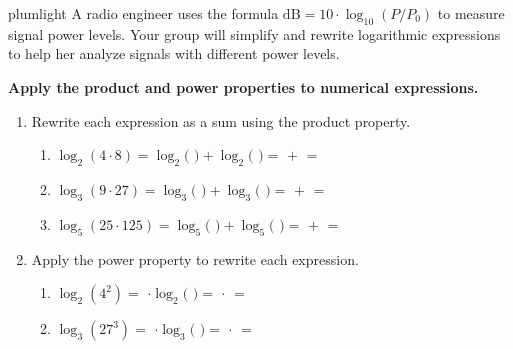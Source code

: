 \documentclass[10pt]{article}
\begin{document}
\namepartnerperiod

\vspace{0.1in}

\begin{scenariobox}{plumlight}
A radio engineer uses the formula $\text{dB} = 10 \cdot \log_{10}(P/P_0)$ to measure signal
power levels. Your group will simplify and rewrite logarithmic expressions to help her
analyze signals with different power levels.
\end{scenariobox}

\vspace{0.1in}

\begin{tcolorbox}[colback=white, colframe=black!40,
    title=\textbf{Tier R --- Remediate},
    fonttitle=\bfseries, arc=2mm, left=3mm, right=3mm, top=2mm, bottom=2mm]

\textbf{Apply the product and power properties to numerical expressions.}

\begin{enumerate}[leftmargin=1.8em, itemsep=10pt]

\item Rewrite each expression as a sum using the product property.

\vspace{4pt}
\begin{enumerate}[leftmargin=1.5em, itemsep=8pt, label=\alph*.]
  \item $\log_2(4 \cdot 8) = \log_2($  $) + \log_2($  $) = $  $+$  $=$ 
  \item $\log_3(9 \cdot 27) = \log_3($  $) + \log_3($  $) = $  $+$  $=$ 
  \item $\log_5(25 \cdot 125) = \log_5($  $) + \log_5($  $) = $  $+$  $=$ 
\end{enumerate}

\vspace{4pt}
\item Apply the power property to rewrite each expression.

\vspace{4pt}
\begin{enumerate}[leftmargin=1.5em, itemsep=8pt, label=\alph*.]
  \item $\log_2(4^2) = $  $\cdot \log_2($  $) = $  $\cdot$  $=$ 
  \item $\log_3(27^3) = $  $\cdot \log_3($  $) = $  $\cdot$  $=$ 
\end{enumerate}

\end{enumerate}
\end{tcolorbox}
\end{document}
